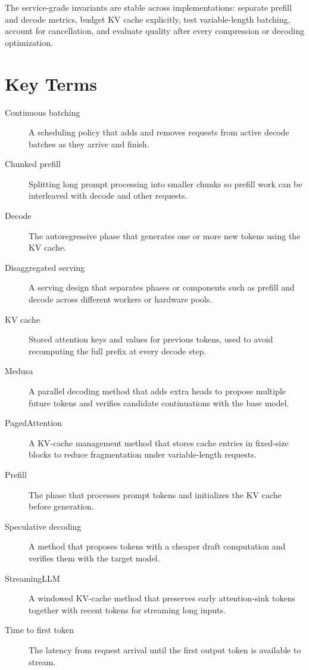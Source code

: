 The service-grade invariants are stable across implementations: separate prefill and decode metrics, budget KV cache explicitly, test variable-length batching, account for cancellation, and evaluate quality after every compression or decoding optimization.

\section{Key Terms}
\label{sec:serving-key-terms}

\begin{description}
\item[Continuous batching] A scheduling policy that adds and removes requests from active decode batches as they arrive and finish.
\item[Chunked prefill] Splitting long prompt processing into smaller chunks so prefill work can be interleaved with decode and other requests.
\item[Decode] The autoregressive phase that generates one or more new tokens using the KV cache.
\item[Disaggregated serving] A serving design that separates phases or components such as prefill and decode across different workers or hardware pools.
\item[KV cache] Stored attention keys and values for previous tokens, used to avoid recomputing the full prefix at every decode step.
\item[Medusa] A parallel decoding method that adds extra heads to propose multiple future tokens and verifies candidate continuations with the base model.
\item[PagedAttention] A KV-cache management method that stores cache entries in fixed-size blocks to reduce fragmentation under variable-length requests.
\item[Prefill] The phase that processes prompt tokens and initializes the KV cache before generation.
\item[Speculative decoding] A method that proposes tokens with a cheaper draft computation and verifies them with the target model.
\item[StreamingLLM] A windowed KV-cache method that preserves early attention-sink tokens together with recent tokens for streaming long inputs.
\item[Time to first token] The latency from request arrival until the first output token is available to stream.
\end{description}

